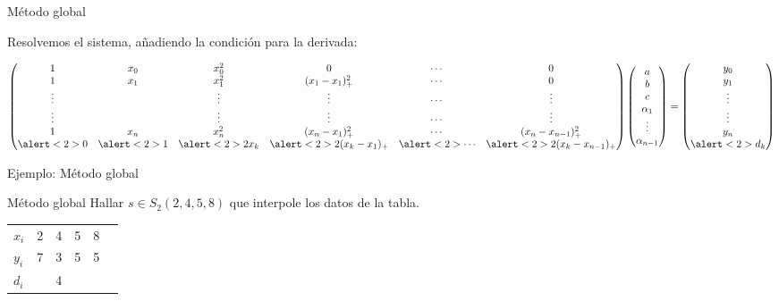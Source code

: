 \documentclass[compress]{beamer}
\theoremstyle{definition}
\theoremstyle{remark}
\begin{document}
\begin{frame}{Método global}

Resolvemos el sistema, añadiendo la condición para la derivada:

\begin{equation*}
\begin{pmatrix}
  1 & x_0 & x_0^2   & 0 & \cdots & 0\\
  1 & x_1 & x_1^2   & (x_1-x_1)_{+}^2 & \cdots & 0\\
  \vdots& & \vdots  & \vdots          & \cdots & \vdots \\
  \vdots& & \vdots  & \vdots          & \cdots & \vdots \\
  1 & x_n & x_n^2   & (x_n-x_1)_{+}^2 & \cdots & (x_n-x_{n-1})_{+}^2\\
  \alert<2>{0} &   \alert<2>{1} &  \alert<2>{2x_k} & \alert<2>{2(x_k-x_1)_{+}} & \alert<2>{\cdots} & \alert<2>{2(x_k-x_{n-1})_{+}}
\end{pmatrix}
\begin{pmatrix}
  a \\
  b \\
  c \\
  \alpha_1 \\
  \vdots \\
  \alpha_{n-1}
\end{pmatrix}
=
\begin{pmatrix}
  y_0\\
  y_1\\
  \vdots\\
  \vdots\\
  y_n\\
  \alert<2>{d_k}\\
\end{pmatrix}
\end{equation*}

\vspace{2pt}

\end{frame}

\begin{frame}{Ejemplo: Método global}
\begin{exampleblock}{Método global}
Hallar $s \in S_2(2,4,5,8)$ que interpole los datos de la tabla.
\begin{table}[h]
\centering
\begin{tabular}{l|ccccc}
$x_i$ & 2 & 4 & 5 & 8 \\
$y_i$ & 7 & 3 & 5 & 5 \\
$d_i$ &   & 4 &   &
\end{tabular}
\end{table}
\end{exampleblock}
\end{frame}
\end{document}

